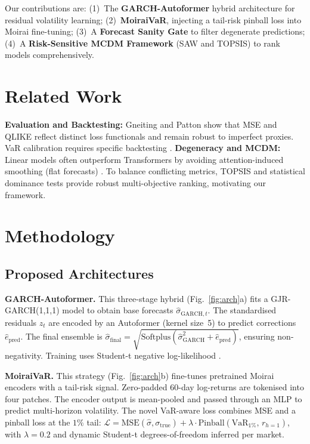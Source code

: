 \documentclass[runningheads,a4paper]{llncs}
\begin{document}
Our contributions are: (1)~The \textbf{GARCH-Autoformer} hybrid architecture for residual volatility learning; (2)~\textbf{MoiraiVaR}, injecting a tail-risk pinball loss into Moirai fine-tuning; (3)~A \textbf{Forecast Sanity Gate} to filter degenerate predictions; (4)~A \textbf{Risk-Sensitive MCDM Framework} (SAW and TOPSIS) to rank models comprehensively.

\section{Related Work}

\textbf{Evaluation and Backtesting:} Gneiting \cite{gneiting2011} and Patton \cite{patton2011} show that MSE and QLIKE reflect distinct loss functionals and remain robust to imperfect proxies. VaR calibration requires specific backtesting \cite{christoffersen1998,kupiec1995}.
\textbf{Degeneracy and MCDM:} Linear models often outperform Transformers by avoiding attention-induced smoothing (flat forecasts) \cite{zeng2023}. To balance conflicting metrics, TOPSIS \cite{hwang1981} and statistical dominance tests \cite{demsar2006} provide robust multi-objective ranking, motivating our framework.

\section{Methodology}

\subsection{Proposed Architectures}

\textbf{GARCH-Autoformer.} This three-stage hybrid (Fig.~\ref{fig:arch}a) fits a GJR-GARCH(1,1,1) model to obtain base forecasts $\hat{\sigma}_{\mathrm{GARCH},t}$. The standardised residuals $z_t$ are encoded by an Autoformer \cite{wu2021} (kernel size~5) to predict corrections $\hat{e}_{\mathrm{pred}}$. The final ensemble is $\hat{\sigma}_{\mathrm{final}} = \sqrt{\mathrm{Softplus}( \hat{\sigma}_{\mathrm{GARCH}}^2 + \hat{e}_{\mathrm{pred}} )}$, ensuring non-negativity. Training uses Student-t negative log-likelihood \cite{bollerslev1987}.

\textbf{MoiraiVaR.} This strategy (Fig.~\ref{fig:arch}b) fine-tunes pretrained Moirai encoders \cite{liu2025} with a tail-risk signal. Zero-padded 60-day log-returns are tokenised into four patches. The encoder output is mean-pooled and passed through an MLP to predict multi-horizon volatility. The novel VaR-aware loss combines MSE and a pinball loss at the $1\%$ tail: $\mathcal{L} = \mathrm{MSE}(\hat{\sigma}, \sigma_{\mathrm{true}}) + \lambda \cdot \mathrm{Pinball}(\mathrm{VaR}_{1\%},\,r_{h=1})$, with $\lambda{=}0.2$ and dynamic Student-t degrees-of-freedom inferred per market.
\end{document}

